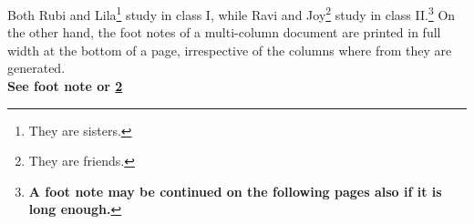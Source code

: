 \documentclass{article}
\begin{document}
	Both Rubi and Lila\footnote{They are sisters.} study in class I, while Ravi and Joy\footnote{They are friends.\label{fn:friends}} study in class II.\LARGE\footnote{\bfseries\large A foot note may be continued on the following pages also if it is long enough.} On the other hand, the foot notes of a multi-column document are printed in full width at the bottom of a page, irrespective of the columns where from they are generated.\\
	\bfseries See foot note  or \ref{fn:friends}
	
\end{document}
